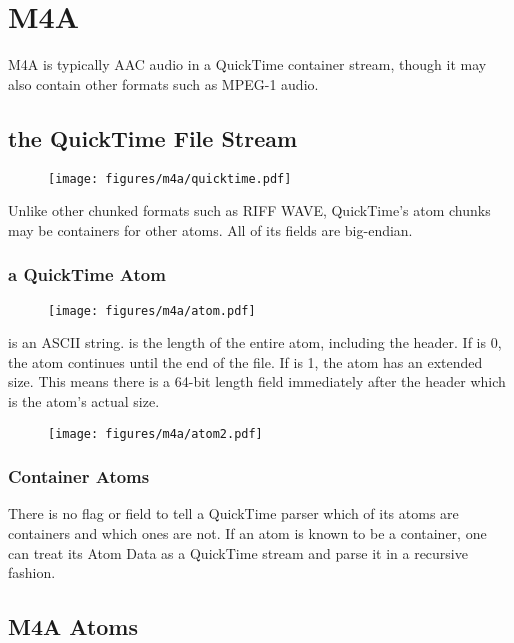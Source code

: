 
\chapter{M4A}
\label{m4a}
M4A is typically AAC audio in a QuickTime container stream, though
it may also contain other formats such as MPEG-1 audio.

\section{the QuickTime File Stream}
\begin{figure}[h]
\texttt{[image: figures/m4a/quicktime.pdf]}
\end{figure}
\par
\noindent
Unlike other chunked formats such as RIFF WAVE, QuickTime's atom chunks
may be containers for other atoms.  All of its fields are big-endian.
\subsection{a QuickTime Atom}
\begin{figure}[h]
\texttt{[image: figures/m4a/atom.pdf]}
\end{figure}
 is an ASCII string.
 is the length of the entire atom, including the header.
If  is 0, the atom continues until the end of the file.
If  is 1, the atom has an extended size.  This means
there is a 64-bit length field immediately after the header which is
the atom's actual size.
\begin{figure}[h]
\texttt{[image: figures/m4a/atom2.pdf]}
\end{figure}
\subsection{Container Atoms}
There is no flag or field to tell a QuickTime parser which
of its atoms are containers and which ones are not.
If an atom is known to be a container, one can treat its Atom Data
as a QuickTime stream and parse it in a recursive fashion.

\clearpage

\section{M4A Atoms}
